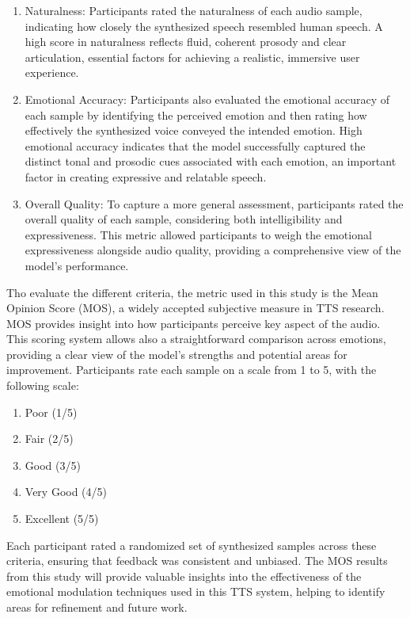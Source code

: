 \begin{enumerate}
\item Naturalness: Participants rated the naturalness of each audio sample, indicating how closely the synthesized speech resembled human speech. A high score in naturalness reflects fluid, coherent prosody and clear articulation, essential factors for achieving a realistic, immersive user experience.

\item Emotional Accuracy: Participants also evaluated the emotional accuracy of each sample by identifying the perceived emotion and then rating how effectively the synthesized voice conveyed the intended emotion. High emotional accuracy indicates that the model successfully captured the distinct tonal and prosodic cues associated with each emotion, an important factor in creating expressive and relatable speech.

\item Overall Quality: To capture a more general assessment, participants rated the overall quality of each sample, considering both intelligibility and expressiveness. This metric allowed participants to weigh the emotional expressiveness alongside audio quality, providing a comprehensive view of the model’s performance.
\end{enumerate}

Tho evaluate the different criteria, the metric used in this study is the Mean Opinion Score (MOS), a widely accepted subjective measure in TTS research. MOS provides insight into how participants perceive key aspect of the audio. This scoring system allows also a straightforward comparison across emotions, providing a clear view of the model’s strengths and potential areas for improvement. Participants rate each sample on a scale from 1 to 5, with the following scale:

\begin{enumerate}
\item Poor (1/5)
\item Fair (2/5)
\item Good (3/5)
\item Very Good (4/5)
\item Excellent (5/5)
\end{enumerate}

Each participant rated a randomized set of synthesized samples across these criteria, ensuring that feedback was consistent and unbiased. The MOS results from this study will provide valuable insights into the effectiveness of the emotional modulation techniques used in this TTS system, helping to identify areas for refinement and future work.

